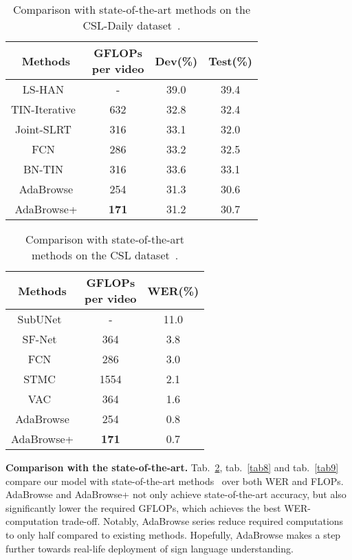 \documentclass[sigconf]{acmart}
\begin{document}
\begin{table}[!t]   
	\centering
  \caption{Comparison with state-of-the-art methods on the CSL-Daily dataset~\cite{zhou2021improving}.} 
	\begin{tabular}{cccc}
	\hline
	Methods & \makecell{GFLOPs \\per video} &  Dev(\%) & Test(\%)\\
	\hline
LS-HAN~\cite{huang2018video} & -  & 39.0  & 39.4\\
	TIN-Iterative~\cite{zhou2021improving} &  632 & 32.8  & 32.4\\ Joint-SLRT~\cite{camgoz2020sign} & 316  & 33.1  & 32.0 \\
	FCN~\cite{cheng2020fully} & 286 & 33.2  & 32.5 \\
	BN-TIN~\cite{zhou2021improving} & 316 & 33.6  & 33.1 \\
	\hline
AdaBrowse & 254 & 31.3 & 30.6 \\
	AdaBrowse+& \textbf{171} & 31.2 & 30.7 \\
	\hline
	\end{tabular}  
	\label{tab6}
	\end{table}
	
\begin{table}[!t]   
	\centering
  \caption{Comparison with state-of-the-art methods on the CSL dataset~\cite{huang2018video}.} 
	\begin{tabular}{ccc}
	  \hline
	  Methods& \makecell{GFLOPs \\per video}&  WER(\%)\\
	  \hline
SubUNet~\cite{cihan2017subunets} & -   & 11.0\\
	  SF-Net~\cite{yang2019sf} & 364 & 3.8 \\
	  FCN~\cite{cheng2020fully} & 286  & 3.0 \\
	  STMC~\cite{zhou2020spatial} & 1554 & 2.1 \\
	  VAC~\cite{Min_2021_ICCV} & 364 & 1.6 \\
	  \hline
AdaBrowse & 254 & 0.8 \\
	  AdaBrowse+ & \textbf{171} & 0.7 \\
	  \hline
	  \end{tabular}  
	  \label{tab7}
	\end{table}

\textbf{Comparison with the state-of-the-art.} Tab.~\ref{tab7}, tab.~\ref{tab8} and tab.~\ref{tab9} compare our model with state-of-the-art methods~\cite{Min_2021_ICCV,pu2019iterative,niu2020stochastic,zhou2020spatial,cui2019deep,cheng2020fully,pu2020boosting,koller2017re,niu2020stochastic} over both WER and FLOPs. AdaBrowse and AdaBrowse+ not only achieve state-of-the-art accuracy, but also significantly lower the required GFLOPs, which achieves the best WER-computation trade-off. 
Notably, AdaBrowse series reduce required computations to only half compared to existing methods. Hopefully, AdaBrowse makes a step further towards real-life deployment of sign language understanding.
\end{document}
